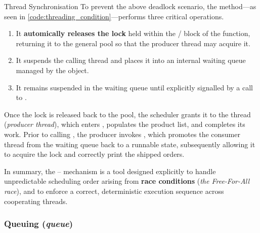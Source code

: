 \documentclass[10pt]{article}
\begin{document}
\begin{core}{Thread Synchronisation}
        To prevent the above deadlock scenario, the  method---as seen in \autoref{code:threading_condition}---performs three critical operations.

        \begin{enumerate}[label=(\arabic*)]

          \item It \textbf{automically releases the lock} held within the  /  block of the  function, returning it to the general pool so that the producer thread may acquire it.

          \item It suspends the calling thread and places it into an internal waiting queue managed by the  object.

          \item It remains suspended in the waiting queue until explicitly signalled by a call to .

        \end{enumerate}

        Once the lock is released back to the pool, the scheduler grants it to the  thread (\textit{producer thread}), which enters , populates the product list, and completes its work. Prior to calling , the producer invokes , which promotes the consumer thread  from the waiting queue back to a runnable state, subsequently allowing it to acquire the lock and correctly print the shipped orders.

        In summary, the -- mechanism is a tool designed explicitly to handle unpredictable scheduling order arising from \textbf{race conditions} (\textit{the Free-For-All race}), and to enforce a correct, deterministic execution sequence across cooperating threads.

      \end{core}
      
    \subsubsection{Queuing (\textit{queue})}
      \label{sec:queue}
\end{document}
